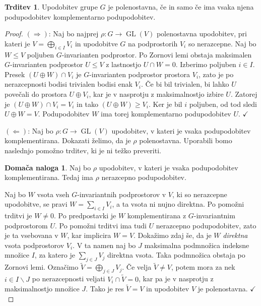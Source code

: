 \documentclass[11pt]{book}
\DeclareMathOperator\GL{GL}
\def\kljuka{$\checkmark$}
\theoremstyle{definition}
\theoremstyle{zgled}
\theoremstyle{zgledbrezstevilke}
\theoremstyle{odprtproblem}
\theoremstyle{domacanaloga}
\newtheorem{domacanaloga}[theorem]{Domača naloga}
\newenvironment{dokaz}
    {\color{siva}\begin{proof}}
    {\end{proof}}
\theoremstyle{izrek}
\newtheorem{trditev}[theorem]{Trditev}
\begin{document}
\begin{trditev}
Upodobitev grupe $G$ je polenostavna, če in samo če ima vsaka njena podupodobitev komplementarno podupodobitev.
\end{trditev}
\begin{dokaz}
$(\Rightarrow)$: Naj bo najprej $\rho \colon G \to \GL(V)$ polenostavna upodobitev, pri kateri je $V = \bigoplus_{i \in I} V_i$ in upodobitve $G$ na podprostorih $V_i$ so nerazcepne. Naj bo $W \leq V$ poljuben $G$-invarianten podprostor. Po Zornovi lemi obstaja maksimalen $G$-invarianten podprostor $U \leq V$ z lastnostjo $U \cap W = 0$. Izberimo poljuben $i \in I$. Presek $(U \oplus W) \cap V_i$ je $G$-invarianten podprostor prostora $V_i$, zato je po nerazcepnosti bodisi trivialen bodisi enak $V_i$. Če bi bil trivialen, bi lahko $U$ povečali do prostora $U \oplus V_i$, kar je v nasprotju z maksimalnostjo izbire $U$. Zatorej je $(U \oplus W) \cap V_i = V_i$ in tako $(U \oplus W) \geq V_i$. Ker je bil $i$ poljuben, od tod sledi $U \oplus W = V$. Podupodobitev $W$ ima torej komplementarno podupodobitev $U$. \kljuka

$(\Leftarrow)$: Naj bo $\rho \colon G \to \GL(V)$ upodobitev, v kateri je vsaka podupodobitev komplementirana. Dokazati želimo, da je $\rho$ polenostavna. Uporabili bomo naslednjo pomožno trditev, ki je ni težko preveriti.

\begin{domacanaloga}
Naj bo $\rho$ upodobitev, v kateri je vsaka podupodobitev komplementirana. Tedaj ima $\rho$ nerazcepno podupodobitev.
\end{domacanaloga}

Naj bo $W$ vsota vseh $G$-invariantnih podprostorov v $V$, ki so nerazcepne upodobitve, se pravi $W = \sum_{i \in I} V_i$, a ta vsota ni nujno direktna. Po pomožni trditvi je $W \neq 0$. Po predpostavki je $W$ komplementirana z $G$-invariantnim podprostorom $U$. Po pomožni trditvi ima tudi $U$ nerazcepno podupodobitev, zato je ta vsebovana v $W$, kar implicira $W = V$. Dokažimo zdaj še, da je $W$ \emph{direktna} vsota podprostorov $V_i$. V ta namen naj bo $J$ maksimalna podmnožica indeksne množice $I$, za katero je $\sum_{j \in J} V_j$ direktna vsota. Taka podmnožica obstaja po Zornovi lemi. Označimo $\tilde V = \bigoplus_{j \in J} V_j$. Če velja $\tilde V \neq V$, potem mora za nek $i \in I \backslash J$ po nerazcepnosti veljati $V_i \cap \tilde V = 0$, kar pa je v nasprotju z maksimalnostjo množice $J$. Tako je res $\tilde V = V$ in upodobitev $V$ je polenostavna. \kljuka
\end{dokaz}
\end{document}

